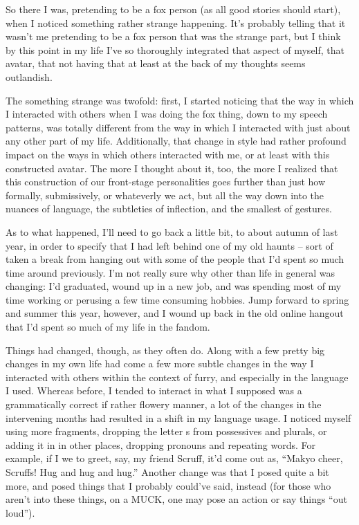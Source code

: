 
So there I was, pretending to be a fox person (as all good stories should start), when I noticed something rather strange happening. It's probably telling that it wasn't me pretending to be a fox person that was the strange part, but I think by this point in my life I've so thoroughly integrated that aspect of myself, that avatar, that not having that at least at the back of my thoughts seems outlandish.

The something strange was twofold: first, I started noticing that the way in which I interacted with others when I was doing the fox thing, down to my speech patterns, was totally different from the way in which I interacted with just about any other part of my life. Additionally, that change in style had rather profound impact on the ways in which others interacted with me, or at least with this constructed avatar. The more I thought about it, too, the more I realized that this construction of our front-stage personalities goes further than just how formally, submissively, or whateverly we act, but all the way down into the nuances of language, the subtleties of inflection, and the smallest of gestures.

As to what happened, I'll need to go back a little bit, to about autumn of last year, in order to specify that I had left behind one of my old haunts -- sort of taken a break from hanging out with some of the people that I'd spent so much time around previously.  I'm not really sure why other than life in general was changing: I'd graduated, wound up in a new job, and was spending most of my time working or perusing a few time consuming hobbies.  Jump forward to spring and summer this year, however, and I wound up back in the old online hangout that I'd spent so much of my life in the fandom.

Things had changed, though, as they often do.  Along with a few pretty big changes in my own life had come a few more subtle changes in the way I interacted with others within the context of furry, and especially in the language I used. Whereas before, I tended to interact in what I supposed was a grammatically correct if rather flowery manner, a lot of the changes in the intervening months had resulted in a shift in my language usage.  I noticed myself using more fragments, dropping the letter s from possessives and plurals, or adding it in in other places, dropping pronouns and repeating words. For example, if I we to greet, say, my friend Scruff, it'd come out as, ``Makyo cheer, Scruffs! Hug and hug and hug.''   Another change was that I posed quite a bit more, and posed things that I probably could've said, instead (for those who aren't into these things, on a MUCK, one may pose an action or say things ``out loud'').

